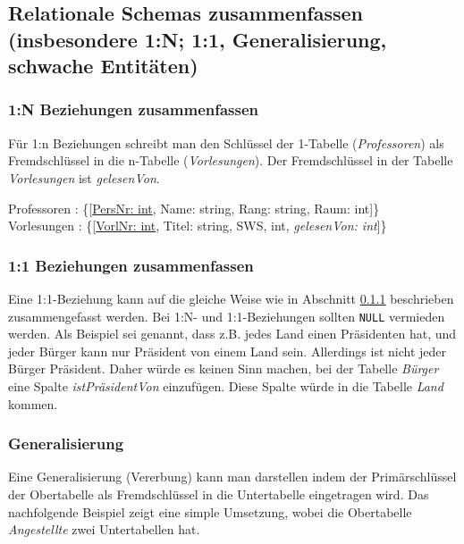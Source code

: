 \subsection{Relationale Schemas zusammenfassen (insbesondere 1:N; 1:1, Generalisierung, schwache Entitäten)}
\label{sec:schema-zusammenfassen}

\subsubsection{1:N Beziehungen zusammenfassen}
\label{sec:1-n-zusammenfassen}

Für 1:n Beziehungen schreibt man den Schlüssel der 1-Tabelle (\emph{Professoren}) als Fremdschlüssel in die n-Tabelle (\emph{Vorlesungen}). Der Fremdschlüssel in der Tabelle \emph{Vorlesungen} ist \emph{gelesenVon}.

\begin{center}
Professoren : \{[\underline{PersNr: int}, Name: string, Rang: string, Raum: int]\} \\
Vorlesungen : \{[\underline{VorlNr: int}, Titel: string, SWS, int, \emph{gelesenVon: int}]\} \\
\end{center}

\subsubsection{1:1 Beziehungen zusammenfassen}

Eine 1:1-Beziehung kann auf die gleiche Weise wie in Abschnitt \ref{sec:1-n-zusammenfassen} beschrieben zusammengefasst werden. Bei 1:N- und 1:1-Beziehungen sollten \texttt{NULL} vermieden werden. Als Beispiel sei genannt, dass z.B. jedes Land einen Präsidenten hat, und jeder Bürger kann nur Präsident von einem Land sein. Allerdings ist nicht jeder Bürger Präsident. Daher würde es keinen Sinn machen, bei der Tabelle \emph{Bürger} eine Spalte \emph{istPräsidentVon} einzufügen. Diese Spalte würde in die Tabelle \emph{Land} kommen.

\subsubsection{Generalisierung}

Eine Generalisierung (Vererbung) kann man darstellen indem der Primärschlüssel der Obertabelle als Fremdschlüssel in die Untertabelle eingetragen wird. Das nachfolgende Beispiel zeigt eine simple Umsetzung, wobei die Obertabelle \emph{Angestellte} zwei Untertabellen hat.

